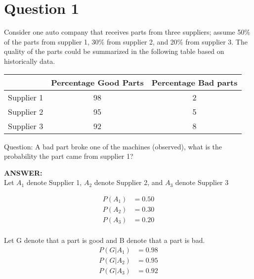 \documentclass{report}
\begin{document}
\chapter{Question 1}

Consider  one auto  company that  receives  parts from  three suppliers;  assume  
50\% of  the parts from  supplier  1,  30\% from  supplier  2,  and 20\% from  supplier  3.  
The quality of  the parts could be  summarized  in  the following table based on  
historically  data.

\begin{center}
  \begin{tabular}{ | c | c | c | } 
    \hline
      & Percentage Good Parts & Percentage Bad parts \\ 
    \hline
    Supplier 1 & 98 & 2 \\ 
    \hline
    Supplier 2 & 95 & 5 \\ 
    \hline
    Supplier 3 & 92 & 8 \\ 
    \hline
  \end{tabular}
\end{center}

Question: A bad part  broke one of  the machines  (observed), what  is  the 
probability the part  came  from  supplier  1?

\hspace{1cm}

\textbf{ANSWER:} \\

Let $A_1$ denote Supplier 1, $A_2$ denote Supplier 2, and $A_3$ denote Supplier 3

\begin{equation} \label{eq3}
  \begin{split}
    P(A_1) & = 0.50 \\
    P(A_2) & = 0.30 \\
    P(A_3) & = 0.20 \\
  \end{split}
\end{equation}

Let G denote that a part is good and B denote that a part is bad. \\

\begin{equation} \label{eq3}
  \begin{split}
    P(G|A_1) & = 0.98 \\
    P(G|A_2) & = 0.95 \\
    P(G|A_3) & = 0.92 \\
  \end{split}
\end{equation}
\end{document}
